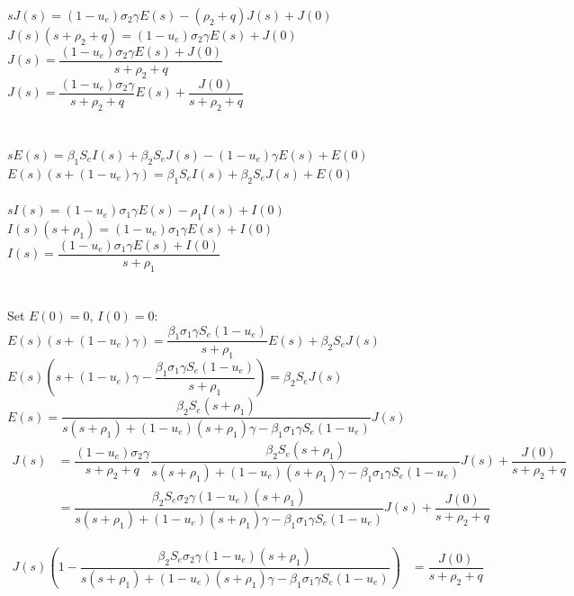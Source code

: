 \documentclass[fleqn]{article}
\begin{document}
$sJ(s) = (1-u_e) \sigma_2 \gamma E(s) - (\rho_2 + q) J(s) + J(0)$ \\
$J(s)(s + \rho_2 + q) = (1-u_e) \sigma_2 \gamma E(s) + J(0)$ \\
$J(s) = \dfrac{(1-u_e) \sigma_2 \gamma E(s) + J(0)}{s + \rho_2 + q}$ \\
$J(s) = \dfrac{(1-u_e) \sigma_2 \gamma}{s + \rho_2 + q} E(s) + \dfrac{J(0)}{s + \rho_2 + q}$ \\
\\
\\
$sE(s) = \beta_1 S_e I(s) + \beta_2 S_e J(s) - (1-u_e) \gamma E(s) + E(0)$ \\
$E(s)(s + (1-u_e) \gamma) = \beta_1 S_e I(s) + \beta_2 S_e J(s) + E(0)$ \\
\\
$sI(s) = (1-u_e) \sigma_1 \gamma E(s) - \rho_1 I(s) + I(0)$ \\
$I(s)(s + \rho_1) = (1-u_e) \sigma_1 \gamma E(s) + I(0)$ \\
$I(s) = \dfrac{(1-u_e) \sigma_1 \gamma E(s) + I(0)}{s + \rho_1}$ \\
\\
\\
Set $E(0) = 0$, $I(0) = 0$: \\
$E(s)(s + (1-u_e) \gamma) = \dfrac{\beta_1 \sigma_1 \gamma S_e (1-u_e)}{s + \rho_1} E(s) + \beta_2 S_e J(s)$ \\
$E(s)\left(s + (1-u_e) \gamma - \dfrac{\beta_1 \sigma_1 \gamma S_e (1-u_e)}{s + \rho_1}\right) = \beta_2 S_e J(s)$ \\
$E(s) = \dfrac{\beta_2 S_e (s + \rho_1)}{s (s + \rho_1) + (1-u_e) (s + \rho_1) \gamma - \beta_1 \sigma_1 \gamma S_e (1-u_e)} J(s)$ \\

\begin{equation*}
\begin{split}
J(s) & = \dfrac{(1-u_e) \sigma_2 \gamma}{s + \rho_2 + q} \dfrac{\beta_2 S_e (s + \rho_1)}{s (s + \rho_1) + (1-u_e) (s + \rho_1) \gamma - \beta_1 \sigma_1 \gamma S_e (1-u_e)} J(s) + \dfrac{J(0)}{s + \rho_2 + q} \\
    & = \dfrac{\beta_2 S_e \sigma_2 \gamma (1-u_e)(s + \rho_1)}{s (s + \rho_1) + (1-u_e) (s + \rho_1) \gamma - \beta_1 \sigma_1 \gamma S_e (1-u_e)} J(s) + \dfrac{J(0)}{s + \rho_2 + q}
\end{split}
\end{equation*}

\begin{equation*}
\begin{split}
J(s)\left(1 - \dfrac{\beta_2 S_e \sigma_2 \gamma (1-u_e)(s + \rho_1)}{s (s + \rho_1) + (1-u_e) (s + \rho_1) \gamma - \beta_1 \sigma_1 \gamma S_e (1-u_e)}\right) & = \dfrac{J(0)}{s + \rho_2 + q}
\end{split}
\end{equation*}
\end{document}

